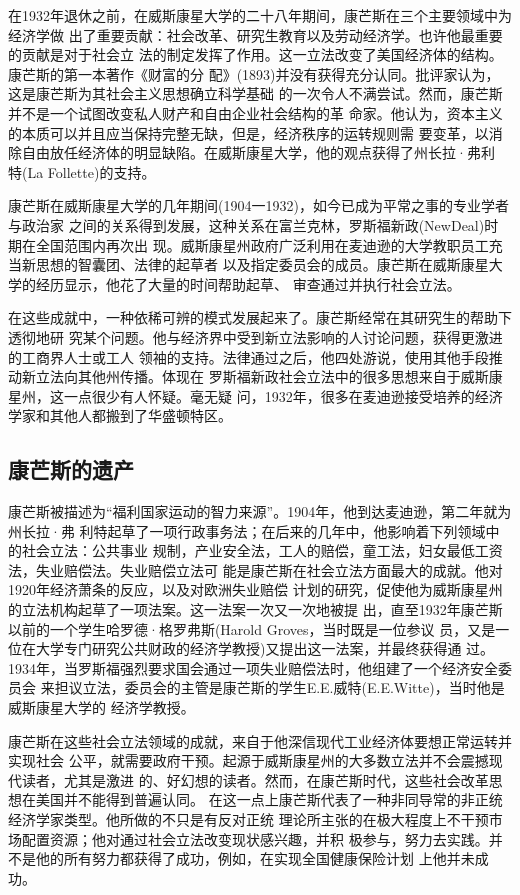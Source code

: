 在1932年退休之前，在威斯康星大学的二十八年期间，康芒斯在三个主要领域中为经济学做
出了重要贡献：社会改革、研究生教育以及劳动经济学。也许他最重要的贡献是对于社会立
法的制定发挥了作用。这一立法改变了美国经济体的结构。康芒斯的第一本著作《财富的分
配》(1893)并没有获得充分认同。批评家认为，这是康芒斯为其社会主义思想确立科学基础
的一次令人不满尝试。然而，康芒斯并不是一个试图改变私人财产和自由企业社会结构的革
命家。他认为，资本主义的本质可以并且应当保持完整无缺，但是，经济秩序的运转规则需
要变革，以消除自由放任经济体的明显缺陷。在威斯康星大学，他的观点获得了州长拉·弗利
特(La Follette)的支持。

康芒斯在威斯康星大学的几年期间(1904一1932)，如今已成为平常之事的专业学者与政治家
之间的关系得到发展，这种关系在富兰克林，罗斯福新政(NewDeal)时期在全国范围内再次出
现。威斯康星州政府广泛利用在麦迪逊的大学教职员工充当新思想的智囊团、法律的起草者
以及指定委员会的成员。康芒斯在威斯康星大学的经历显示，他花了大量的时间帮助起草、
审查通过并执行社会立法。

在这些成就中，一种依稀可辨的模式发展起来了。康芒斯经常在其研究生的帮助下透彻地研
究某个问题。他与经济界中受到新立法影响的人讨论问题，获得更激进的工商界人士或工人
领袖的支持。法律通过之后，他四处游说，使用其他手段推动新立法向其他州传播。体现在
罗斯福新政社会立法中的很多思想来自于威斯康星州，这一点很少有人怀疑。毫无疑
问，1932年，很多在麦迪逊接受培养的经济学家和其他人都搬到了华盛顿特区。

\subsection{康芒斯的遗产}

康芒斯被描述为“福利国家运动的智力来源”。1904年，他到达麦迪逊，第二年就为州长拉·弗
利特起草了一项行政事务法；在后来的几年中，他影响着下列领域中的社会立法：公共事业
规制，产业安全法，工人的赔偿，童工法，妇女最低工资法，失业赔偿法。失业赔偿立法可
能是康芒斯在社会立法方面最大的成就。他对1920年经济萧条的反应，以及对欧洲失业赔偿
计划的研究，促使他为威斯康星州的立法机构起草了一项法案。这一法案一次又一次地被提
出，直至1932年康芒斯以前的一个学生哈罗德·格罗弗斯(Harold Groves，当时既是一位参议
员，又是一位在大学专门研究公共财政的经济学教授)又提出这一法案，并最终获得通
过。1934年，当罗斯福强烈要求国会通过一项失业赔偿法时，他组建了一个经济安全委员会
来担议立法，委员会的主管是康芒斯的学生E.E.威特(E.E.Witte)，当时他是威斯康星大学的
经济学教授。

康芒斯在这些社会立法领域的成就，来自于他深信现代工业经济体要想正常运转并实现社会
公平，就需要政府干预。起源于威斯康星州的大多数立法并不会震撼现代读者，尤其是激进
的、好幻想的读者。然而，在康芒斯时代，这些社会改革思想在美国并不能得到普遍认同。
在这一点上康芒斯代表了一种非同导常的非正统经济学家类型。他所做的不只是有反对正统
理论所主张的在极大程度上不干预市场配置资源；他对通过社会立法改变现状感兴趣，并积
极参与，努力去实践。并不是他的所有努力都获得了成功，例如，在实现全国健康保险计划
上他并未成功。

